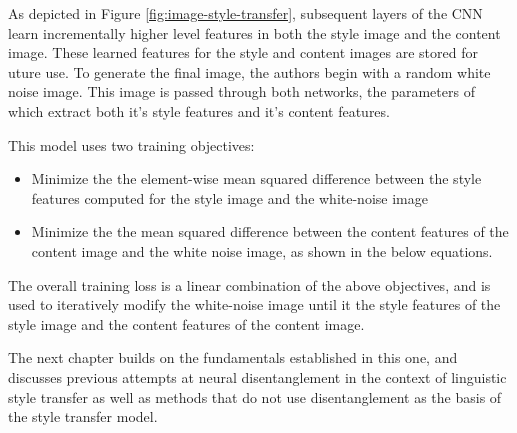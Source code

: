 As depicted in Figure \ref{fig:image-style-transfer}, subsequent layers of the CNN learn incrementally higher level features in both the style image and the content image. These learned features for the style and content images are stored for uture use. To generate the final image, the authors begin with a random white noise image. This image is passed through both networks, the parameters of which extract both it's style features and it's content features.

This model uses two training objectives:
\begin{itemize}
	\item Minimize the the element-wise mean squared difference between the style features computed for the style image and the white-noise image
	\item Minimize the the mean squared difference between the content features of the content image and the white noise image, as shown in the below equations.
\end{itemize}

The overall training loss is a linear combination of the above objectives, and is used to iteratively modify the white-noise image until it the style features of the style image and the content features of the content image.

The next chapter builds on the fundamentals established in this one, and discusses previous attempts at neural disentanglement in the context of linguistic style transfer as well as methods that do not use disentanglement as the basis of the style transfer model.
